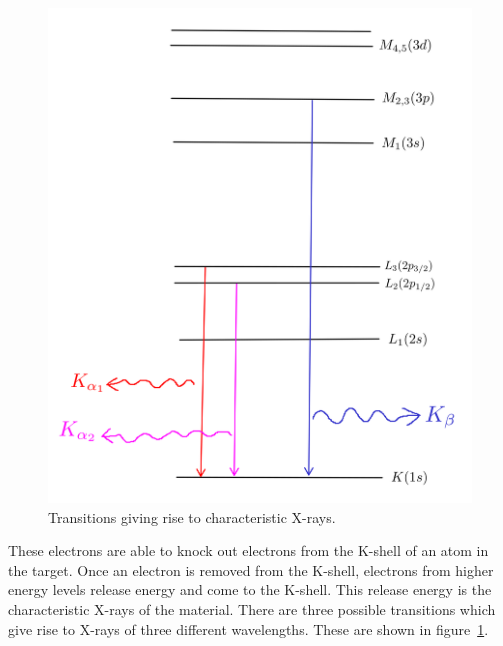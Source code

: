 \begin{figure}[h]
	\centering
	\includegraphics[scale=0.1]{characteristic_xray_transitions.png}
	\caption{\label{fig:xray_transitions}Transitions giving rise to characteristic X-rays.}
\end{figure}
	
	These electrons are able to knock out electrons from the K-shell of an atom in the target. Once an electron is removed from the K-shell, electrons from higher energy levels release energy and come to the K-shell. This release energy is the characteristic X-rays of the material. There are three possible transitions which give rise to X-rays of three different wavelengths. These are shown in figure~\ref{fig:xray_transitions}.
	

